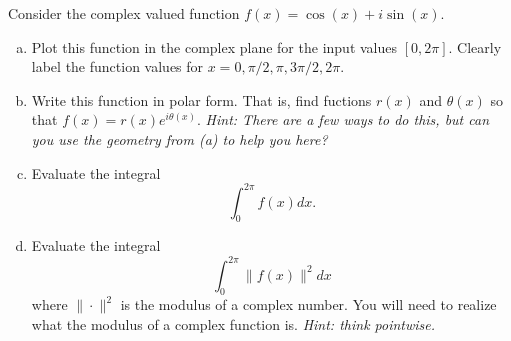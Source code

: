 \documentclass[12pt]{article} %
\begin{document}
\newpage
\begin{problem}
	Consider the complex valued function $f(x) = \cos(x)+i\sin(x)$.  
	\begin{enumerate}[(a)]
		\item Plot this function in the complex plane for the input values $[0,2\pi]$. Clearly label the function values for $x=0,\pi/2,\pi,3\pi/2,2\pi$.
		\item Write this function in polar form. That is, find fuctions $r(x)$ and $\theta(x)$ so that $f(x)=r(x)e^{i\theta(x)}$. \emph{Hint: There are a few ways to do this, but can you use the geometry from (a) to help you here?}
		\item Evaluate the integral
		\[
			\int_0^{2\pi}f(x)dx.
		\]
		\item Evaluate the integral
		\[
			\int_0^{2\pi} \|f(x)\|^2dx
		\]
		where $\|\cdot\|^2$ is the modulus of a complex number. You will need to realize what the modulus of a complex function is. \emph{Hint: think pointwise.}
	\end{enumerate}
\end{problem}
\end{document}
